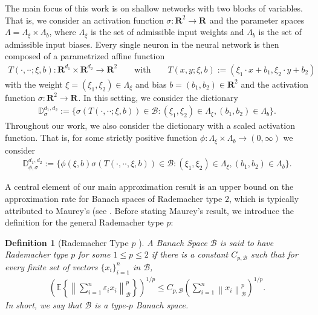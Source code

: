 \documentclass[a4paper]{article}
\newcommand{\rr}[1]{\mathbf{R}^{#1}}
\newcommand{\rrI}{\rr{d_1}}
\newcommand{\rrII}{\rr{d_2}}
\newcommand{\rrIxII}{\rrI\times\rrII}
\newcommand{\normbig}[2]{\left\|#1\right\|_{#2}}
\numberwithin{equation}{section}
\newtheorem{definition}[theorem]{Definition}
\theoremstyle{remark}
\begin{document}
The main focus of this work is on shallow networks with two blocks of variables.
That is, we consider an activation function $\sigma:\rr{2}\to\rr{}$ and the
parameter spaces $\Lambda=\Lambda_\xi\times\Lambda_b$,
where $\Lambda_\xi$ is the set of admissible input weights
and $\Lambda_b$ is the set of admissible input biases.
Every single neuron in the neural network is
then composed of a parametrized affine function
\begin{align*}
    T(\cdot,\cdot\cdot;\xi,b):\rrIxII\to\rr{2}
    \qquad\text{with}\qquad
    T(x,y;\xi,b):=(\xi_1\cdot x+b_1,\xi_2\cdot y+b_2)
\end{align*}
with the weight $\xi=(\xi_1,\xi_2)\in\Lambda_\xi$ and bias $b=(b_1,b_2)\in\rr{2}$
and the activation function $\sigma:\rr{2}\to\rr{}$.
In this setting, we consider the dictionary
\begin{align*}
    \mathbb{D}_\sigma^{d_1,d_2}:=\{\sigma(T(\cdot,\cdot\cdot;\xi,b))\in \mathcal{B}:(\xi_1,\xi_2)\in\Lambda_\xi,(b_1,b_2)\in\Lambda_b\}.
\end{align*}
Throughout our work,
we also consider the dictionary with a scaled activation function.
That is, for some strictly positive function
$\phi:\Lambda_\xi\times\Lambda_b\to(0,\infty)$
we consider
\begin{align*}
    \mathbb{D}_{\phi,\sigma}^{d_1,d_2}:=\{\phi(\xi,b)\sigma(T(\cdot,\cdot\cdot,\xi,b))\in \mathcal{B}:(\xi_1,\xi_2)\in\Lambda_\xi,(b_1,b_2)\in\Lambda_b\}.
\end{align*}


A central element of our main approximation result is an upper bound on the approximation rate for Banach spaces of Rademacher type $2$, which is typically attributed to Maurey's (see \cite{Pisier80RemarquesResultatNon,Barron93UniversalApproximationBounds,Siegel22SharpBoundsApproximation}.
Before stating Maurey's result,
we introduce the definition for the general Rademacher type $p$:
\begin{definition}[Rademacher Type $p$ {\cite[Definition 6.2.10]{Albiac06TopicsBanachSpace}}]
    A Banach Space $\mathcal{B}$ is said to have Rademacher type $p$ for some $1\leq p\leq 2$ if there is a constant $C_{p,\mathcal{B}}$ such that for every finite set of vectors $\{x_i\}_{i=1}^n$ in $\mathcal{B}$,
    \begin{align*}
        \left(\mathbb{E}\left\{
                \normbig{\sum_{i=1}^n\varepsilon_ix_i}{\mathcal{B}}^p
            \right\}\right)^{1/p}
        \leq
        C_{p,\mathcal{B}}\left(\sum_{i=1}^n\normbig{x_i}{\mathcal{B}}^p\right)^{1/p}.
    \end{align*}
    In short, we say that $\mathcal{B}$ is a type-$p$ Banach space.
\end{definition}
\end{document}
